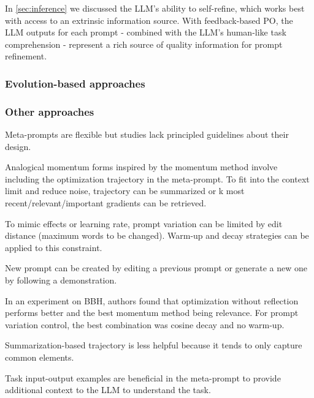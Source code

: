 \newpage

In \ref{sec:inference} we discussed the LLM's ability to self-refine, which works best with access to an extrinsic information source.
With feedback-based PO, the LLM outputs for each prompt - combined with the LLM's human-like task comprehension\cite{xiang2025selfsupervisedpromptoptimization} -
represent a rich source of quality information for prompt refinement. 

\subsubsection{Evolution-based approaches}

\subsubsection{Other approaches}




Meta-prompts are flexible but studies lack principled guidelines about their design. \cite{tang2024unleashingpotentiallargelanguage}

Analogical momentum forms inspired by the momentum method involve including the optimization trajectory in the meta-prompt. 
To fit into the context limit and reduce noise, trajectory can be summarized or k most recent/relevant/important gradients can be retrieved. \cite{tang2024unleashingpotentiallargelanguage}

To mimic effects or learning rate, prompt variation can be limited by edit distance (maximum words to be changed). 
Warm-up and decay strategies can be applied to this constraint. \cite{tang2024unleashingpotentiallargelanguage}

New prompt can be created by editing a previous prompt or generate a new one by following a demonstration. \cite{tang2024unleashingpotentiallargelanguage}

In an experiment on BBH, authors found that optimization without reflection performs better and the best momentum method being relevance. 
For prompt variation control, the best combination was cosine decay and no warm-up.  \cite{tang2024unleashingpotentiallargelanguage}

Summarization-based trajectory is less helpful because it tends to only capture common elements. \cite{tang2024unleashingpotentiallargelanguage}

Task input-output examples are beneficial in the meta-prompt to provide additional context to the LLM to understand the task. \cite{tang2024unleashingpotentiallargelanguage}

